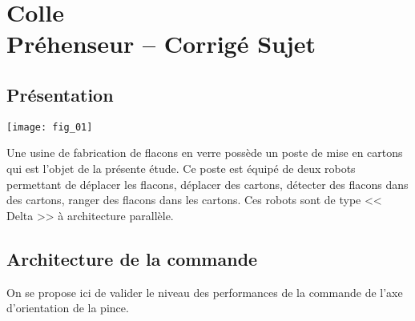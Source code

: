 \chapter*{Colle  \\
Préhenseur -- \ifprof Corrigé \else Sujet \fi}


\iflivret {} \else
\ifprof  {} \else \fi
\fi
\setcounter{question}{0}

\begin{marginfigure}
\end{marginfigure}


\section*{Présentation}
\begin{marginfigure}
\texttt{[image: fig\_01]}
\end{marginfigure}

Une usine de fabrication de flacons en verre possède un poste de mise en cartons qui est l'objet de la présente étude. Ce poste est équipé de deux robots permettant de déplacer les flacons, déplacer des cartons, détecter des flacons dans des cartons, ranger des flacons dans les cartons.
Ces robots sont de type << Delta >> à architecture parallèle. 


\section*{Architecture de la commande}
On se propose ici de valider le niveau des performances de la commande de l’axe d’orientation de la pince.


